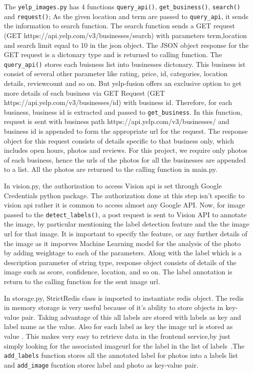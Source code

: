 The \verb|yelp_images.py| has 4 functions \verb|query_api()|,
\verb|get_business()|, \verb|search()| and \verb|request()|; As the
given location and term are passed to \verb|query_api|, it sends the
information to search function. The search function sends a GET
request (GET https://api.yelp.com/v3/businesses/search) with
parameters term,location and search limit equal to 10 in the json
object. The JSON object response for the GET request is a dictonary
type and is returned to calling function. The \verb|query_api()|
stores each buisness list into businesses dictonary. This business ist
consist of several other parameter like rating, price, id, categories,
location details, reviewcount and so on. But yelp-fusion offers an
exclusive option to get more details of each business via GET Request
(GET https://api.yelp.com/v3/businesses/{id}) with business
id. Therefore, for each business, business id is extracted and passed
to \verb|get_business|. In this function, request is sent with
business path https://api.yelp.com/v3/businesses/ and business id is
appended to form the appropriate url for the request.  The response
object for this request consists of details specific to that business
only, which includes open hours, photos and reviews. For this project,
we require only photos of each business, hence the urls of the photos
for all the businesses are appended to a list. All the photos are
returned to the calling function in main.py.

In vision.py, the authorization to access Vision api is set through
Google Credentials python package. The authorization done at this step
isn't specific to vision api rather it is common to access almost any
Google API. Now, for image passed to the \verb|detect_labels()|, a
post request is sent to Vision API to annotate the image, by
particular mentioning the label detection feature and the the image
url for that image. It is important to specify the feature, or any
further details of the image as it imporves Machine Learning model for
the analysis of the photo by adding weightage to each of the
parameters. Along with the label which is a description parameter of
string type, response object consists of details of the image such as
score, confidence, location, and so on. The label annotation is return
to the calling function for the sent image url.

In storage.py, StrictRedis class is imported to instantiate redis
object. The redis in memory storage is very useful because of it’s
ability to store objects in key-value pair. Taking advantage of this
all labels are stored with labels as key and label name as the
value. Also for each label as key the image url is stored as value
. This makes very easy to retrieve data in the frontend service,by
just simply looking for the associated imageurl for the label in the
list of labels~\cite{hid-sp18-602-redis-implementation}.The
\verb|add_labels| function stores all the annotated label for photos
into a labels list and \verb|add_image| fucntion stores label and
photo as key-value pair.

